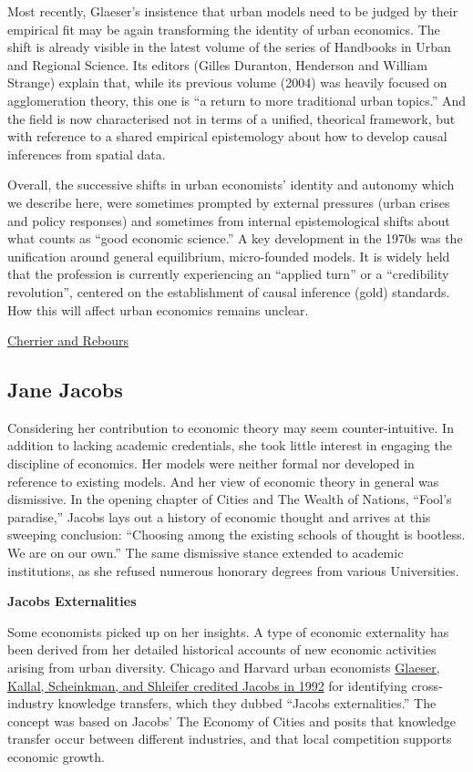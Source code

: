 \documentclass[
]{book}
\begin{document}
Most recently, Glaeser's insistence that urban models need to be judged by their empirical fit may be again transforming the identity of urban economics. The shift is already visible in the latest volume of the series of Handbooks in Urban and Regional Science. Its editors (Gilles Duranton, Henderson and William Strange) explain that, while its previous volume (2004) was heavily focused on agglomeration theory, this one is ``a return to more traditional urban topics.'' And the field is now characterised not in terms of a unified, theorical framework, but with reference to a shared empirical epistemology about how to develop causal inferences from spatial data.

Overall, the successive shifts in urban economists' identity and autonomy which we describe here, were sometimes prompted by external pressures (urban crises and policy responses) and sometimes from internal epistemological shifts about what counts as ``good economic science.'' A key development in the 1970s was the unification around general equilibrium, micro-founded models. It is widely held that the profession is currently experiencing an ``applied turn'' or a ``credibility revolution'', centered on the establishment of causal inference (gold) standards. How this will affect urban economics remains unclear.

\href{https://hscif.org/economists-in-the-city-cherrierrebours/}{Cherrier and Rebours}

\hypertarget{jane-jacobs}{%
\subsection{Jane Jacobs}\label{jane-jacobs}}

Considering her contribution to economic theory may seem counter-intuitive. In addition to lacking academic credentials, she took little interest in engaging the discipline of economics. Her models were neither formal nor developed in reference to existing models. And her view of economic theory in general was dismissive. In the opening chapter of Cities and The Wealth of Nations, ``Fool's paradise,'' Jacobs lays out a history of economic thought and arrives at this sweeping conclusion: ``Choosing among the existing schools of thought is bootless. We are on our own.'' The same dismissive stance extended to academic institutions, as she refused numerous honorary degrees from various Universities.

\textbf{Jacobs Externalities}

Some economists picked up on her insights. A type of economic externality has been derived from her detailed historical accounts of new economic activities arising from urban diversity. Chicago and Harvard urban economists \href{https://www.nber.org/papers/w3787}{Glaeser, Kallal, Scheinkman, and Shleifer credited Jacobs in 1992} for identifying cross-industry knowledge transfers, which they dubbed ``Jacobs externalities.''
The concept was based on Jacobs' The Economy of Cities and posits that knowledge transfer occur between different industries, and that local competition supports economic growth.
\end{document}
